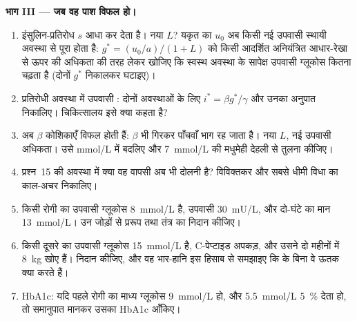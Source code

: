 \begin{problem}
\medskip
\noindent\textbf{भाग III --- जब वह पाश विफल हो।}
\begin{enumerate}[resume]
  \item इंसुलिन-प्रतिरोध $s$ आधा कर देता है। नया $L$? यकृत का $u_{0}$
        अब किसी नई उपवासी स्थायी अवस्था से पूरा होता है: $g^{*} = (u_{0}/a)/(1
        + L)$ को किसी आदर्शित अनियंत्रित आधार-रेखा से ऊपर की अधिकता की
        तरह लेकर खोजिए कि स्वस्थ अवस्था के सापेक्ष उपवासी ग्लूकोस
        कितना चढ़ता है (दोनों $g^{*}$ निकालकर घटाइए)।
  \item प्रतिरोधी अवस्था में उपवासी : दोनों अवस्थाओं के लिए $i^{*} = \beta
        g^{*}/\gamma$ और उनका अनुपात निकालिए। चिकित्सालय
        इसे क्या कहता है?
  \item अब $\beta$ कोशिकाएँ विफल होती हैं: $\beta$ भी गिरकर पाँचवाँ भाग
        रह जाता है। नया $L$, नई उपवासी अधिकता। उसे mmol/L में बदलिए और
        \qty{7}{mmol/L} की मधुमेही देहली से तुलना कीजिए।
  \item प्रश्न~15 की अवस्था में क्या वह वापसी अब भी दोलनी है?
        विविक्तकर और सबसे धीमी विधा का काल-अचर निकालिए।
  \item किसी रोगी का उपवासी ग्लूकोस \qty{8}{mmol/L} है, उपवासी 
        \qty{30}{mU/L}, और दो-घंटे का मान \qty{13}{mmol/L}। उन जोड़ों
        से प्ररूप तथा तंत्र का निदान कीजिए।
  \item किसी दूसरे का उपवासी ग्लूकोस \qty{15}{mmol/L} है, C-पेप्टाइड
        अपकड़, और उसने दो महीनों में \qty{8}{kg} खोए हैं। निदान कीजिए,
        और वह भार-हानि इस हिसाब से समझाइए कि  के बिना वे ऊतक
        क्या करते हैं।
  \item HbA1c: यदि पहले रोगी का माध्य ग्लूकोस \qty{9}{mmol/L} हो, और
        \qty{5.5}{mmol/L} \qty{5}{\%} देता हो, तो समानुपात मानकर उसका
        HbA1c आँकिए।
\end{enumerate}


\end{problem}
